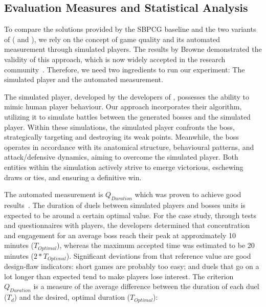 \subsection{Evaluation Measures and Statistical Analysis}

To compare the solutions provided by the SBPCG baseline and the two variants of \ApproachName{} (\simhotep{} and \timhotep{}), we rely on the concept of game quality and its automated measurement through simulated players. The results by Browne \etal demonstrated the validity of this approach, which is now widely accepted in the research community~\cite{browne2010evolutionary}. Therefore, we need two ingredients to run our experiment: The simulated player and the automated measurement.

The simulated player, developed by the developers of  \CaseStudy{}, possesses the ability to mimic human player behaviour. Our approach incorporates their algorithm, utilizing it to simulate battles between the generated bosses and the simulated player. Within these simulations, the simulated player confronts the boss, strategically targeting and destroying its weak points. Meanwhile, the boss operates in accordance with its anatomical structure, behavioural patterns, and attack/defensive dynamics, aiming to overcome the simulated player. Both entities within the simulation actively strive to emerge victorious, eschewing draws or ties, and ensuring a definitive win. 

The automated measurement is $Q_{Duration}$ which was proven to achieve good results~\cite{browne2010evolutionary}. The duration of duels between simulated players and bosses units is expected to be around a certain optimal value. For the \CaseStudy{} case study, through tests and questionnaires with players, the developers determined that concentration and engagement for an average boss reach their peak at approximately 10 minutes ($T_{Optimal}$), whereas the maximum accepted time was estimated to be 20 minutes ($2*T_{Optimal}$). Significant deviations from that reference value are good design-flaw indicators: short games are probably too easy; and duels that go on a lot longer than expected tend to make players lose interest. The criterion $Q_{Duration}$ is a measure of the average difference between the duration of each duel ($T_{d}$) and the desired, optimal duration ($T_{Optimal}$):

